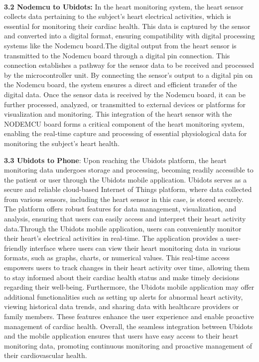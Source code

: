 \\
\textbf{3.2 Nodemcu to Ubidots:}
In the heart monitoring system, the heart sensor collects data pertaining to the subject's heart electrical activities, which is essential for monitoring their cardiac health. This data is captured by the sensor and converted into a digital format, ensuring compatibility with digital processing systems like the Nodemcu board.The digital output from the heart sensor is transmitted to the Nodemcu board through a digital pin connection. This connection establishes a pathway for the sensor data to be received and processed by the microcontroller unit. By connecting the sensor's output to a digital pin on the Nodemcu board, the system ensures a direct and efficient transfer of the digital data.
Once the sensor data is received by the Nodemcu board, it can be further processed, analyzed, or transmitted to external devices or platforms for visualization and monitoring. This integration of the heart sensor with the NODEMCU board forms a critical component of the heart monitoring system, enabling the real-time capture and processing of essential physiological data for monitoring the subject's heart health.
  
\textbf{3.3 Ubidots to Phone}: 
Upon reaching the Ubidots platform, the heart monitoring data undergoes storage and processing, becoming readily accessible to the patient or user through the Ubidots mobile application. Ubidots serves as a secure and reliable cloud-based Internet of Things platform, where data collected from various sensors, including the heart sensor in this case, is stored securely. The platform offers robust features for data management, visualization, and analysis, ensuring that users can easily access and interpret their heart activity data.Through the Ubidots mobile application, users can conveniently monitor their heart's electrical activities in real-time. The application provides a user-friendly interface where users can view their heart monitoring data in various formats, such as graphs, charts, or numerical values. This real-time access empowers users to track changes in their heart activity over time, allowing them to stay informed about their cardiac health status and make timely decisions regarding their well-being.
Furthermore, the Ubidots mobile application may offer additional functionalities such as setting up alerts for abnormal heart activity, viewing historical data trends, and sharing data with healthcare providers or family members. These features enhance the user experience and enable proactive management of cardiac health. Overall, the seamless integration between Ubidots and the mobile application ensures that users have easy access to their heart monitoring data, promoting continuous monitoring and proactive management of their cardiovascular health.





